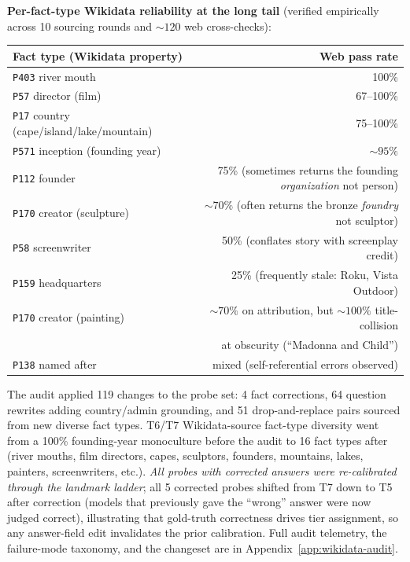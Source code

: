 \documentclass[11pt]{article}
\begin{document}
\textbf{Per-fact-type Wikidata reliability at the long tail} (verified empirically across 10 sourcing rounds and ${\sim}120$ web cross-checks):

\begin{center}
\small
\begin{tabular}{lr}
\toprule
\textbf{Fact type (Wikidata property)} & \textbf{Web pass rate} \\
\midrule
\texttt{P403} river mouth                          & 100\% \\
\texttt{P57} director (film)                       & 67--100\% \\
\texttt{P17} country (cape/island/lake/mountain)   & 75--100\% \\
\texttt{P571} inception (founding year)            & ${\sim}95\%$ \\
\texttt{P112} founder                              & 75\% (sometimes returns the founding \emph{organization} not person) \\
\texttt{P170} creator (sculpture)                  & ${\sim}70\%$ (often returns the bronze \emph{foundry} not sculptor) \\
\texttt{P58} screenwriter                          & 50\% (conflates story with screenplay credit) \\
\texttt{P159} headquarters                         & 25\% (frequently stale: Roku, Vista Outdoor) \\
\texttt{P170} creator (painting)                   & ${\sim}70\%$ on attribution, but ${\sim}100\%$ title-collision \\
                                                   & at obscurity (``Madonna and Child'') \\
\texttt{P138} named after                          & mixed (self-referential errors observed) \\
\bottomrule
\end{tabular}
\end{center}

The audit applied 119 changes to the probe set: 4 fact corrections, 64 question rewrites adding country/admin grounding, and 51 drop-and-replace pairs sourced from new diverse fact types. T6/T7 Wikidata-source fact-type diversity went from a 100\% founding-year monoculture before the audit to 16 fact types after (river mouths, film directors, capes, sculptors, founders, mountains, lakes, painters, screenwriters, etc.). \emph{All probes with corrected answers were re-calibrated through the landmark ladder}; all 5 corrected probes shifted from T7 down to T5 after correction (models that previously gave the ``wrong'' answer were now judged correct), illustrating that gold-truth correctness drives tier assignment, so any answer-field edit invalidates the prior calibration. Full audit telemetry, the failure-mode taxonomy, and the changeset are in Appendix~\ref{app:wikidata-audit}.
\end{document}
